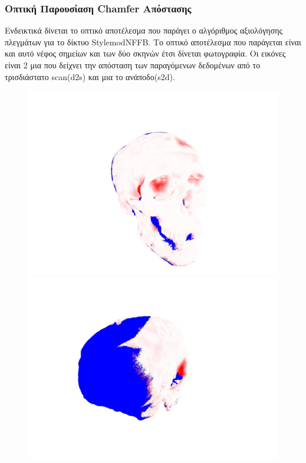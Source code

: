 \subsubsection{Οπτική Παρουσίαση Chamfer Απόστασης}
Ενδεικτικά δίνεται το οπτικό αποτέλεσμα που παράγει ο αλγόριθμος αξιολόγησης πλεγμάτων για το δίκτυο StylemodNFFB. Το οπτικό αποτέλεσμα που παράγεται είναι και αυτό νέφος σημείων και των δύο σκηνών έτσι δίνεται φωτογραφία. Οι εικόνες είναι 2 μια που δείχνει την απόσταση των παραγόμενων δεδομένων από το τρισδιάστατο scan(d2s) και μια το ανάποδο(s2d). 



\begin{figure}[H]
  \begin{minipage}{0.5\linewidth}
    \centering
    \includegraphics[width=\linewidth]{images/chapter5_img/ChamferDistViz/d2s_stylemod_nffb_front.jpg}
  \end{minipage}%
  \begin{minipage}{0.5\linewidth}
    \centering
    \includegraphics[width=\linewidth]{images/chapter5_img/ChamferDistViz/d2s_skull_stylemodnffb_back.jpg}

\end{minipage}
\end{figure}
